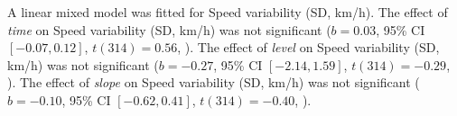 A linear mixed model was fitted for Speed variability (SD, km/h).
The effect of \textit{time} on Speed variability (SD, km/h) was not significant ($b = 0.03$, 95\% CI $[-0.07, 0.12]$, $t(314) = 0.56$, ).
The effect of \textit{level} on Speed variability (SD, km/h) was not significant ($b = -0.27$, 95\% CI $[-2.14, 1.59]$, $t(314) = -0.29$, ).
The effect of \textit{slope} on Speed variability (SD, km/h) was not significant ($b = -0.10$, 95\% CI $[-0.62, 0.41]$, $t(314) = -0.40$, ).
